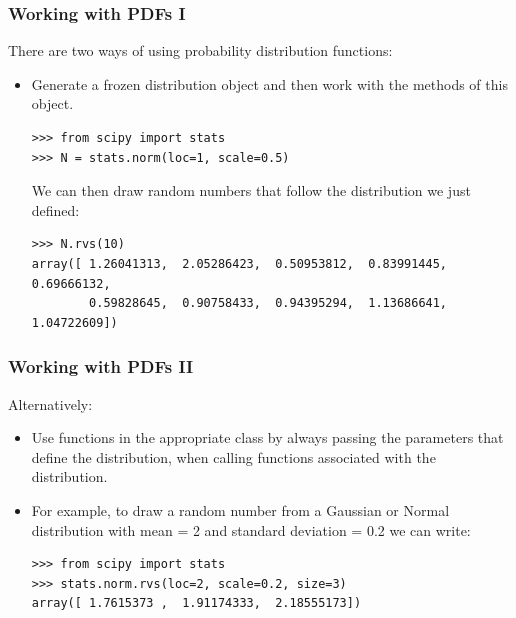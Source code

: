\documentclass[10pt,colorlinks]{beamer}
\begin{document}
\begin{frame}[fragile]\frametitle{Working with PDFs I }
  There are two ways of using probability distribution functions:
\begin{itemize}
    \item Generate a frozen distribution object and then work with the methods of this object.
\begin{verbatim}
>>> from scipy import stats
>>> N = stats.norm(loc=1, scale=0.5)
\end{verbatim}

    We can then draw random numbers that follow the distribution we just defined:
\begin{verbatim}
>>> N.rvs(10)
array([ 1.26041313,  2.05286423,  0.50953812,  0.83991445,  0.69666132,
        0.59828645,  0.90758433,  0.94395294,  1.13686641,  1.04722609])
\end{verbatim}


\end{itemize}

\end{frame}

\begin{frame}[fragile]\frametitle{Working with PDFs II}
Alternatively: 
\begin{itemize}
    \item Use functions in the appropriate class by always passing the parameters that define the distribution, when calling functions associated with the distribution.


    \item For example, to draw a random number from a Gaussian or Normal distribution with mean = 2 and standard deviation = 0.2 we can write:
\begin{verbatim}
>>> from scipy import stats
>>> stats.norm.rvs(loc=2, scale=0.2, size=3)
array([ 1.7615373 ,  1.91174333,  2.18555173])
\end{verbatim}

\end{itemize}


\end{frame}
\end{document}
